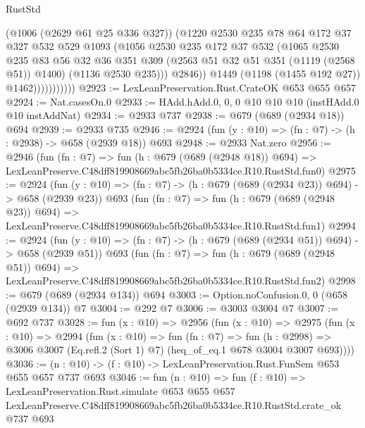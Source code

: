 \begin{lexlean}{RustStd}
\begin{coremodule}
                            (@1006 (@2629 @61 @25 @336 @327))
                            (@1220
                              @2530
                              @235
                              @78
                              @64
                              @172
                              @37
                              @327
                              @532
                              @529
                              @1093
                              (@1056
                                @2530
                                @235
                                @172
                                @37
                                @532
                                (@1065
                                  @2530
                                  @235
                                  @83
                                  @56
                                  @32
                                  @36
                                  @351
                                  @309
                                  (@2563 @51 @32 @51 @351 (@1119 (@2568 @51)) @1400)
                                  (@1136 @2530 @235)))
                              @2846))
                          @1449
                          (@1198 (@1455 @192 @27))
                          @1462)))))))))))
@2923 := LexLeanPreservation.Rust.CrateOK @653 @655 @657
@2924 := Nat.casesOn.{0}
@2933 := HAdd.hAdd.{0, 0, 0} @10 @10 @10 (instHAdd.{0} @10 instAddNat)
@2934 := @2933 @737
@2938 := @679 (@689 (@2934 @18)) @694
@2939 := @2933 @735
@2946 := @2924 (fun (y : @10) => (fn : @7) -> (h : @2938) -> @658 (@2939 @18)) @693
@2948 := @2933 Nat.zero
@2956 := @2946
    (fun (fn : @7) =>
    fun (h : @679 (@689 (@2948 @18)) @694) =>
    LexLeanPreserve.C48dff819908669abc5fb26ba0b5334ce.R10.RustStd.fun0)
@2975 := @2924
    (fun (y : @10) => (fn : @7) -> (h : @679 (@689 (@2934 @23)) @694) -> @658 (@2939 @23))
    @693
    (fun (fn : @7) =>
    fun (h : @679 (@689 (@2948 @23)) @694) =>
    LexLeanPreserve.C48dff819908669abc5fb26ba0b5334ce.R10.RustStd.fun1)
@2994 := @2924
    (fun (y : @10) => (fn : @7) -> (h : @679 (@689 (@2934 @51)) @694) -> @658 (@2939 @51))
    @693
    (fun (fn : @7) =>
    fun (h : @679 (@689 (@2948 @51)) @694) =>
    LexLeanPreserve.C48dff819908669abc5fb26ba0b5334ce.R10.RustStd.fun2)
@2998 := @679 (@689 (@2934 @134)) @694
@3003 := Option.noConfusion.{0, 0} (@658 (@2939 @134)) @7
@3004 := @292 @7
@3006 := @3003 @3004 @7
@3007 := @692 @737
@3028 := fun (x : @10) =>
  @2956
    (fun (x : @10) =>
    @2975
      (fun (x : @10) =>
      @2994
        (fun (x : @10) =>
        fun (fn : @7) =>
        fun (h : @2998) =>
        @3006 @3007 (Eq.refl.{2} (Sort 1) @7) (heq_of_eq.{1} @678 @3004 @3007 @693))))
@3036 := (n : @10) -> (f : @10) -> LexLeanPreservation.Rust.FunSem @653 @655 @657 @737 @693
@3046 := fun (n : @10) =>
  fun (f : @10) =>
  LexLeanPreservation.Rust.simulate
    @653
    @655
    @657
    LexLeanPreserve.C48dff819908669abc5fb26ba0b5334ce.R10.RustStd.crate_ok
    @737
    @693
\end{coremodule}
\end{lexlean}
